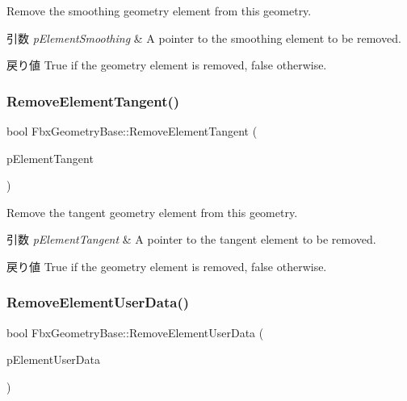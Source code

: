 Remove the smoothing geometry element from this geometry. 
\begin{DoxyParams}{引数}
{\em p\+Element\+Smoothing} & A pointer to the smoothing element to be removed. \\
\hline
\end{DoxyParams}
\begin{DoxyReturn}{戻り値}
{\ttfamily True} if the geometry element is removed, {\ttfamily false} otherwise. 
\end{DoxyReturn}
\mbox{\label{class_fbx_geometry_base_a9289899568d50f8b60c3a33761c92446}} 
\subsubsection{\texorpdfstring{Remove\+Element\+Tangent()}{RemoveElementTangent()}}
{\footnotesize\ttfamily bool Fbx\+Geometry\+Base\+::\+Remove\+Element\+Tangent (\begin{DoxyParamCaption}\item[{\hyperlink{fbxlayer_8h_a291cacd8b247483cc24704c8f49087a7}{Fbx\+Geometry\+Element\+Tangent} $\ast$}]{p\+Element\+Tangent }\end{DoxyParamCaption})}

Remove the tangent geometry element from this geometry. 
\begin{DoxyParams}{引数}
{\em p\+Element\+Tangent} & A pointer to the tangent element to be removed. \\
\hline
\end{DoxyParams}
\begin{DoxyReturn}{戻り値}
{\ttfamily True} if the geometry element is removed, {\ttfamily false} otherwise. 
\end{DoxyReturn}
\mbox{\label{class_fbx_geometry_base_abf8c753f38229a2b076ec20a17da6807}} 
\subsubsection{\texorpdfstring{Remove\+Element\+User\+Data()}{RemoveElementUserData()}}
{\footnotesize\ttfamily bool Fbx\+Geometry\+Base\+::\+Remove\+Element\+User\+Data (\begin{DoxyParamCaption}\item[{\hyperlink{fbxlayer_8h_acef498b248e323a189b5ccbf478b0b41}{Fbx\+Geometry\+Element\+User\+Data} $\ast$}]{p\+Element\+User\+Data }\end{DoxyParamCaption})}

